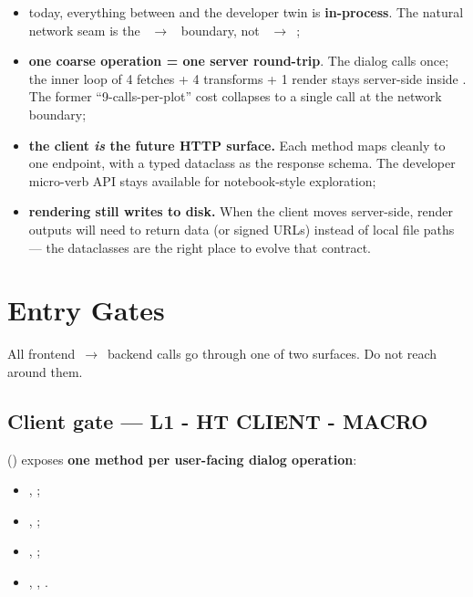 \begin{itemize}
    \item today, everything between  and the developer twin is \textbf{in-process}. The natural network seam is the ~$\rightarrow$~ boundary, not ~$\rightarrow$~;
    \item \textbf{one coarse operation = one server round-trip}. The dialog calls  once; the inner loop of 4 fetches + 4 transforms + 1 render stays server-side inside . The former ``9-calls-per-plot'' cost collapses to a single call at the network boundary;
    \item \textbf{the client \emph{is} the future HTTP surface.} Each  method maps cleanly to one endpoint, with a typed  dataclass as the response schema. The developer micro-verb API stays available for notebook-style exploration;
    \item \textbf{rendering still writes to disk.} When the client moves server-side, render outputs will need to return data (or signed URLs) instead of local file paths --- the  dataclasses are the right place to evolve that contract.
\end{itemize}

\section{Entry Gates}
\label{sec-dev-gates}

All frontend~$\rightarrow$~backend calls go through one of two surfaces. Do not reach around them.

\subsection{Client gate --- L1 - HT CLIENT - MACRO}

 () exposes \textbf{one method per user-facing dialog operation}:

\begin{itemize}
    \item {}, ;
    \item {}, ;
    \item {}, ;
    \item {}, , .
\end{itemize}

